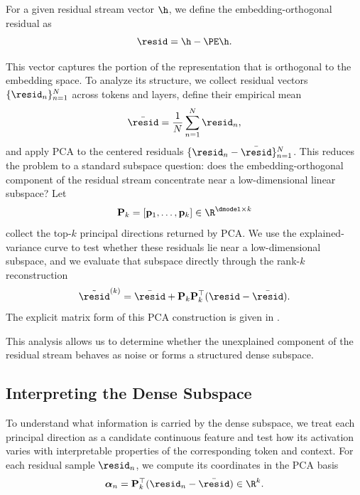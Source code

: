 \documentclass{article}
\begin{document}
For a given residual stream vector $\h$, we define the embedding-orthogonal residual as
\begin{equation}
  \label{eq:embedding-orthogonal-residual}
  \resid = \h - \PE \h .
\end{equation}

This vector captures the portion of the representation that is orthogonal to the embedding space. To analyze its structure, we collect residual vectors $\{\resid_n\}_{n=1}^{N}$ across tokens and layers, define their empirical mean
\begin{equation}
  \bar{\resid} = \frac{1}{N} \sum_{n=1}^{N} \resid_n,
\end{equation}
and apply PCA to the centered residuals $\{\resid_n - \bar{\resid}\}_{n=1}^{N}$. This reduces the problem to a standard subspace question: does the embedding-orthogonal component of the residual stream concentrate near a low-dimensional linear subspace? Let
\begin{equation}
  \label{eq:residual-pca-basis}
  \mathbf{P}_k = [\mathbf{p}_1, \dots, \mathbf{p}_k] \in \R^{\dmodel \times k}
\end{equation}
collect the top-$k$ principal directions returned by PCA. We use the explained-variance curve to test whether these residuals lie near a low-dimensional subspace, and we evaluate that subspace directly through the rank-$k$ reconstruction
\begin{equation}
  \label{eq:residual-pca-reconstruction}
  \tilde{\resid}^{(k)} = \bar{\resid} + \mathbf{P}_k \mathbf{P}_k^\top (\resid - \bar{\resid}) .
\end{equation}
The explicit matrix form of this PCA construction is given in .

This analysis allows us to determine whether the unexplained component of the residual stream behaves as noise or forms a structured dense subspace.

\subsection{Interpreting the Dense Subspace}
\label{subsec:method_dense_subspace}

To understand what information is carried by the dense subspace, we treat each principal direction as a candidate continuous feature and test how its activation varies with interpretable properties of the corresponding token and context. For each residual sample $\resid_n$, we compute its coordinates in the PCA basis
\begin{equation}
  \label{eq:dense-subspace-coordinates}
  \boldsymbol{\alpha}_n = \mathbf{P}_k^\top (\resid_n - \bar{\resid}) \in \R^k .
\end{equation}
\end{document}
